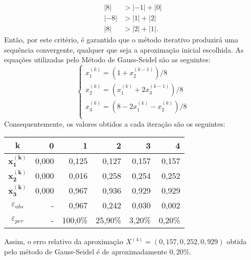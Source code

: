 \documentclass[12pt,a4paper]{article}
\begin{document}
\begin{ExerciseList}
\begin{align*}
| 8| & > |-1| + |0| \\
|-8| & > |1| + |2|\\
| 8| & > |2| + |1|.
\end{align*}
Então, por este critério, é garantido que o método iterativo produzirá uma sequência convergente, qualquer que seja a aproximação inicial escolhida. As equações utilizadas pelo Método de Gauss-Seidel são as seguintes:
\[
\begin{cases}
x_1^{(k)} = (1 + x_2^{(k-1)})/8\\
x_2^{(k)} = (x_1^{(k)} + 2x_3^{(k-1)})/8\\
x_3^{(k)} = (8 - 2x_1^{(k)} - x_2^{(k)})/8\\
\end{cases}
\]
Consequentemente, os valores obtidos a cada iteração são os seguintes:
\medskip
\begin{center}
\begin{tabular}{crrrrr}
\hline
$\boldsymbol{k}$     & 0 & 1 & 2 & 3 & 4\\
\hline
$\boldsymbol{x_1^{(k)}}$ & 0,000 & 0,125 & 0,127 & 0,157 & 0,157 \\
$\boldsymbol{x_2^{(k)}}$ & 0,000 & 0,016 & 0,258 & 0,254 & 0,252 \\
$\boldsymbol{x_3^{(k)}}$ & 0,000 & 0,967 & 0,936 & 0,929 & 0,929 \\
\hline
$\varepsilon_{abs}$ & - & 0,967 & 0,242 & 0,030 & 0,002 \\
\hline
$\varepsilon_{per}$ & - & 100,0\% & 25,90\% & 3,20\% & 0,20\% \\
\hline
\end{tabular}
\end{center}
\medskip
Assim, o erro relativo da aproximação $X^{(4)} = (0,157, 0,252, 0,929)$ obtida pelo método de Gauss-Seidel é de aproximadamente $0,20\%$.



\end{ExerciseList}
\end{document}
